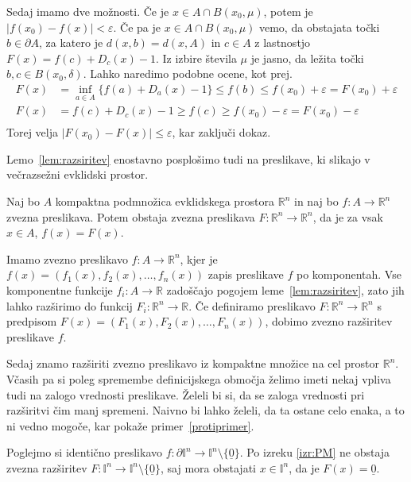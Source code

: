 \documentclass[mat1]{fmfdelo}
\newcommand{\R}{\mathbb R}
\newcommand{\I}{\mathbb I}
\newcommand{\0}{\underline{0}}
\begin{document}
\begin{dokaz}
Sedaj imamo dve možnosti. Če je $x \in A \cap B(x_0, \mu)$, potem je $|f(x_0) - f(x)| < \varepsilon$. Če pa je $x \in A \cap B(x_0, \mu)$ vemo, da obstajata točki $b \in \partial A$, za katero je $d(x, b) = d(x, A)$ in $c \in A $ z lastnostjo $F(x) = f(c) + D_c(x) -1$. Iz izbire števila $\mu$ je jasno, da ležita točki $b, c \in B(x_0, \delta)$. Lahko naredimo podobne ocene, kot prej.
 \begin{equation*} \label{eq1}
\begin{split}
F(x) & = \inf_{a \in A} \{ f(a) + D_a(x) - 1\} \leq f(b) \leq f(x_0) +\varepsilon = F(x_0) +\varepsilon\\
F(x) & = f(c) + D_c(x) -1 \geq f(c) \geq f(x_0) - \varepsilon =  F(x_0) -\varepsilon \\
\end{split}
\end{equation*}
 Torej velja $| F(x_0) - F(x) | \leq \varepsilon$, kar zaključi dokaz.
\end{dokaz}

Lemo~\ref{lem:razsiritev} enostavno posplošimo tudi na preslikave, ki slikajo v večrazsežni evklidski prostor.

\begin{posledica}
Naj bo $A$ kompaktna podmnožica evklidskega prostora $\R^n$ in naj bo \mbox{$f : A \to \R^n$} zvezna preslikava. Potem obstaja zvezna preslikava $F : \R^n \to \R^n$, da je za vsak $x \in A$, $f(x) = F(x)$.
\end{posledica}

\begin{dokaz}
Imamo zvezno preslikavo $f : A \to \R^n$, kjer je $f(x) = (f_1(x), f_2(x), \dots , f_n(x))$ zapis preslikave $f$ po komponentah. Vse komponentne funkcije $f_i : A \to \R$ zadoščajo pogojem leme~\ref{lem:razsiritev}, zato jih lahko razširimo do funkcij $F_i : \R^n \to \R$. Če definiramo preslikavo $F : \R^n \to \R^n$ s predpisom $F(x) = (F_1(x), F_2(x), \dots , F_n(x))$, dobimo zvezno razširitev preslikave $f$.
\end{dokaz}
Sedaj znamo razširiti zvezno preslikavo iz kompaktne množice na cel prostor $\R^n$. Včasih pa si poleg spremembe definicijskega območja želimo imeti nekaj vpliva tudi na zalogo vrednosti preslikave. Želeli bi si, da se zaloga vrednosti pri razširitvi čim manj spremeni. Naivno bi lahko želeli, da ta ostane celo enaka, a to ni vedno mogoče, kar pokaže primer~\ref{protiprimer}.

\begin{primer}\label{protiprimer}
Poglejmo si identično preslikavo $f : \partial \I^n \to \I^n \setminus \{ \0 \}$. Po izreku \ref{izr:PM} ne obstaja zvezna razširitev $F : \I^n \to \I^n \setminus \{ \0 \}$, saj mora obstajati $x \in \I^n$, da je $F(x) = \0$. 
\end{primer}
\end{document}

